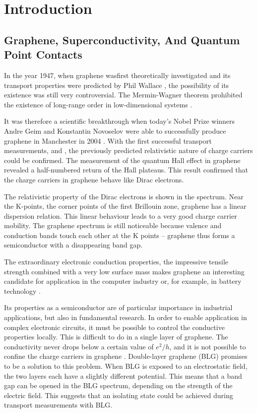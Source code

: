 \chapter{Introduction}
\label{ch:introduction}

\section*{Graphene, Superconductivity, And Quantum Point Contacts}
In the year 1947, when graphene wasfirst  theoretically investigated and its transport properties were predicted by Phil Wallace \cite{Wallace1947}, the possibility of its existence was still very controversial. The Mermin-Wagner theorem prohibited the existence of long-range order in low-dimensional systems \cite{Mermin1966}.

It was therefore a scientific breakthrough when today's Nobel Prize winners Andre Geim and Konstantin Novoselov were able to successfully produce graphene in Manchester in 2004 \cite{Novoselov2004}. With the first successful transport measurements, \cite{Zhang2005} and \cite{Novoselov2005}, the previously predicted relativistic nature of charge carriers \cite{Semenoff1984} could be confirmed. The measurement of the quantum Hall effect in graphene revealed a half-numbered return of the Hall plateaus. This result confirmed that the charge carriers in graphene behave like Dirac electrons.

The relativistic property of the Dirac electrons is shown in the spectrum. Near the K-points, the corner points of the first Brillouin zone, graphene has a linear dispersion relation. This linear behaviour leads to a very good charge carrier mobility. The graphene spectrum is still noticeable because valence and conduction bands touch each other at the K points -- graphene thus forms a semiconductor with a disappearing band gap. 

The extraordinary electronic conduction properties, the impressive tensile strength combined with a very low surface mass makes graphene an interesting candidate for application in the computer industry \cite{Jurewicz2014} or, for example, in battery technology \cite{Son2017}.

Its properties as a semiconductor are of particular importance in industrial applications, but also in fundamental research. In order to enable application in complex electronic circuits, it must be possible to control the conductive properties locally. This is difficult to do in a single layer of graphene. The conductivity never drops below a certain value of $e^2/h$, and it is not possible to confine the charge carriers in graphene \cite{Katsnelson2006}. Double-layer graphene (BLG) promises to be a solution to this problem. When BLG is exposed to an electrostatic field, the two layers each have a slightly different potential. This means that a band gap can be opened in the BLG spectrum, depending on the strength of the electric field. This suggests that an isolating state could be achieved during transport measurements with BLG.

